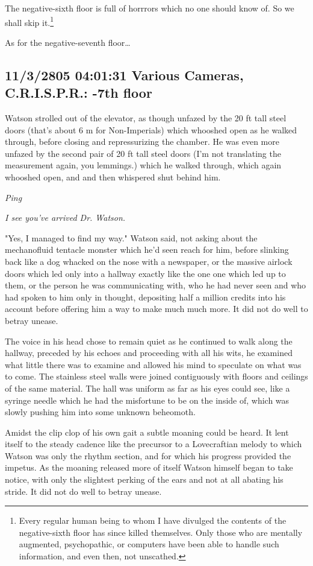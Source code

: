 \documentclass[12pt]{article}
\begin{document}
The negative-sixth floor is full of horrrors which no one should know of. So we shall skip it.\footnote{Every regular human being to whom I have divulged the contents of the negative-sixth floor has since killed themselves. Only those who are mentally augmented, psychopathic, or computers have been able to handle such information, and even then, not unscathed.}

As for the negative-seventh floor\ldots{}

\subsection*{11/3/2805 04:01:31 Various Cameras, C.R.I.S.P.R.: -7th floor}
\label{sec:orgabb8c93}

Watson strolled out of the elevator, as though unfazed by the 20 ft tall steel doors (that's about 6 m for Non-Imperials) which whooshed open as he walked through, before closing and repressurizing the chamber. He was even more unfazed by the second pair of 20 ft tall steel doors (I'm not translating the measurement again, you lemmings.) which he walked through, which again whooshed open, and and then whispered shut behind him.

\emph{Ping}

\emph{I see you've arrived Dr. Watson.}

"Yes, I managed to find my way." Watson said, not asking about the mechanofluid tentacle monster which he'd seen reach for him, before slinking back like a dog whacked on the nose with a newspaper, or the massive airlock doors which led only into a hallway exactly like the one one which led up to them, or the person he was communicating with, who he had never seen and who had spoken to him only in thought, depositing half a million credits into his account before offering him a way to make much much more. It did not do well to betray unease.

The voice in his head chose to remain quiet as he continued to walk along the hallway, preceded by his echoes and proceeding with all his wits, he examined what little there was to examine and allowed his mind to speculate on what was to come. The stainless steel walls were joined contiguously with floors and ceilings of the same material. The hall was uniform as far as his eyes could see, like a syringe needle which he had the misfortune to be on the inside of, which was slowly pushing him into some unknown beheomoth.

Amidst the clip clop of his own gait a subtle moaning could be heard. It lent itself to the steady cadence like the precursor to a Lovecraftian melody to which Watson was only the rhythm section, and for which his progress provided the impetus. As the moaning released more of itself Watson himself began to take notice, with only the slightest perking of the ears and not at all abating his stride. It did not do well to betray unease.
\end{document}

